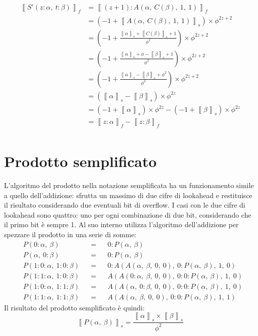 \documentclass[Lau]{sapthesis}
\begin{document}
\begin{align*}
\left\llbracket S'(z:\alpha, \ t:\beta) \right\rrbracket_f & = \left\llbracket (z+1):A(\alpha, \ C(\beta), \ 1, \ 1) \right\rrbracket_f\\
& = \left( -1 + \left\llbracket A(\alpha, \ C(\beta), \ 1, \ 1) \right\rrbracket_s \right) \times \phi^{2z+2}\\
& = \left( -1 + \frac{\left\llbracket \alpha \right\rrbracket_s + \left\llbracket C(\beta) \right\rrbracket_s + 1}{\phi^2} \right) \times \phi^{2z+2}\\
& = \left( -1 + \frac{\left\llbracket \alpha \right\rrbracket_s + \phi - \left\llbracket \beta \right\rrbracket_s + 1}{\phi^2} \right) \times \phi^{2z+2}\\
& = \left( -1 + \frac{\left\llbracket \alpha \right\rrbracket_s - \left\llbracket \beta \right\rrbracket_s + \phi^2}{\phi^2} \right) \times \phi^{2z+2}\\
& = \left( \left\llbracket \alpha \right\rrbracket_s - \left\llbracket \beta \right\rrbracket_s \right) \times \phi^{2z}\\
& = \left( -1 + \left\llbracket \alpha \right\rrbracket_s \right) \times \phi^{2z} - \left( -1 + \left\llbracket \beta \right\rrbracket_s \right) \times \phi^{2z}\\
& = \left\llbracket z:\alpha \right\rrbracket_f - \left\llbracket z:\beta \right\rrbracket_f\\
\end{align*}


\section{Prodotto semplificato}
L'algoritmo del prodotto nella notazione semplificata ha un funzionamento simile a quello dell'addizione: sfrutta un massimo di due cifre di lookahead e restituisce il risultato considerando due eventuali bit di overflow. I casi con le due cifre di lookahead sono quattro: uno per ogni combinazione di due bit, considerando che il primo bit è sempre 1. Al suo interno utilizza l'algoritmo dell'addizione per spezzare il prodotto in una serie di somme:
\begin{align*}
&P(0:\alpha, \ \beta) && = && 0:P(\alpha, \ \beta)\\
&P(\alpha, \ 0:\beta) && = && 0:P(\alpha, \ \beta)\\
&P(1:0:\alpha, \ 1:0:\beta) && = && 0:A(A(\alpha, \ \beta, \ 0, \ 0), \ 0:P(\alpha, \ \beta), \ 1, \ 0)\\
&P(1:1:\alpha, \ 1:0:\beta) && = && A(A(0:\alpha, \ \beta, \ 0, \ 0), \ 0:0:P(\alpha, \ \beta), \ 1, \ 0)\\
&P(1:0:\alpha, \ 1:1:\beta) && = && A(A(\alpha, \ 0:\beta, \ 0, \ 0), \ 0:0:P(\alpha, \ \beta), \ 1, \ 0)\\
&P(1:1:\alpha, \ 1:1:\beta) && = && A(A(\alpha, \ \beta, \ 0, \ 0), \ 0:0:P(\alpha, \ \beta), \ 1, \ 1)
\end{align*}
Il risultato del prodotto semplificato è quindi:
$$\left\llbracket P(\alpha, \ \beta) \right\rrbracket_s = \frac{\left\llbracket \alpha \right\rrbracket_s \times \left\llbracket \beta \right\rrbracket_s}{\phi^2}$$
\end{document}
